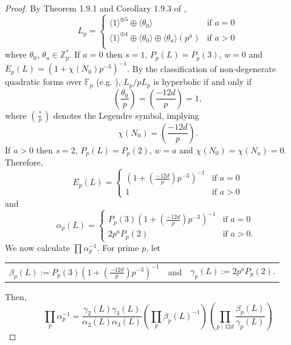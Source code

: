 \documentclass[12pt, a4paper]{article}
\newcommand{\ZZ}{\mathbb{Z}}
\newcommand{\FF}{\mathbb{F}}
\newcommand{\la}{\langle}
\newcommand{\ra}{\rangle}
\newcommand{\op}{\oplus}
\begin{document}
\begin{proof}
  By Theorem 1.9.1 and Corollary 1.9.3 of \cite{Nikulin},
  \begin{equation*}
    L_p =
    \begin{cases}
      \la 1 \ra^{\op 5} \op \la \theta_0 \ra & \text{if $a=0$}\\
      \la 1 \ra^{\op 4} \op \la \theta_0 \ra \op \la \theta_a \ra (p^a) & \text{if $a>0$} \\
    \end{cases}
  \end{equation*}
  where $\theta_0$, $\theta_a \in \ZZ_p^*$.
  If $a=0$ then $s=1$, $P_p(L)=P_p(3)$, $w=0$ and 
  $E_p(L) = (1 + \chi(N_0)p^{-3})^{-1}$.
  By the classification of non-degenerate quadratic forms over $\FF_p$ (e.g. \cite[p.63]{Dieudonne}), $L_p / pL_p$ is hyperbolic if and only if
  \begin{equation*}
    \left ( \frac{\theta_0}{p} \right ) =  \left (\frac{-12d}{p} \right ) = 1,
  \end{equation*}
  where $\left ( \frac{*}{p} \right)$ denotes the Legendre symbol, 
  implying 
  \begin{equation*}
    \chi(N_0) =  \left ( \frac{-12d}{p} \right ).
  \end{equation*}
  If $a>0$ then $s=2$, $P_p(L)=P_p(2)$, $w=a$ and $\chi(N_0) = \chi(N_a) = 0$.
  Therefore, 
  \[
  E_p(L) =
  \begin{cases}
    (1 + \left ( \frac{- 12d}{p} \right) p^{-3})^{-1} & \text{if $a=0$} \\
    1 & \text{if $a>0$}
  \end{cases}
  \]
  and
\[ 
  \alpha_p(L) =
  \begin{cases}
    P_p(3)(1 + \left ( \frac{- 12d}{p} \right ) p^{-3} )^{-1} & \text{if $a = 0$ } \\
    2 p^a P_p(2) & \text{if $a>0$.}
  \end{cases}
\] 
We now calculate $\prod \alpha_p^{-1}$.
  For prime $p$, let
\begin{center}
\begin{tabular}{c c c }
    $\beta_p(L):=P_p(3)(1 + \left ( \frac{-12d}{p} \right )p^{-3} )^{-1}$ & and &
    $\gamma_p(L) := 2p^a P_p(2)$.
\end{tabular}
\end{center}
    Then,
  \begin{equation*}
    \prod_p \alpha_p^{-1}  =  \frac{\gamma_2(L) \gamma_3(L)}{\alpha_2(L) \alpha_3(L)} \left ( \prod_p \beta_p(L)^{-1} \right ) \left ( \prod_{p \mid 12d} \frac{\beta_p(L)}{\gamma_p(L)} \right )
  \end{equation*}

\end{proof}
\end{document}
